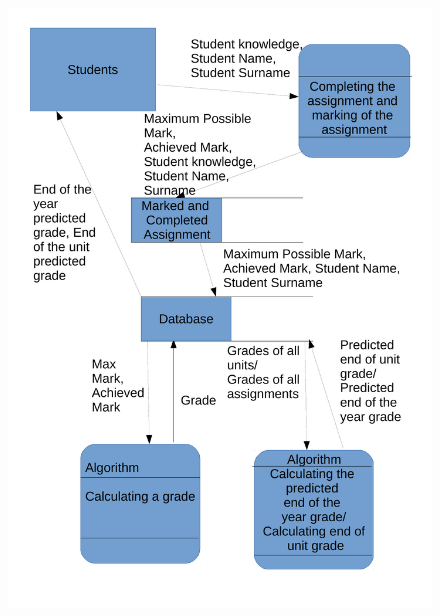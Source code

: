 \begin{algorithm}[H]
\begin{figure}[H]
    \includegraphics[width=\textwidth]{./Analysis/images/222DataFlowDiagram.pdf}
\end{figure}


\end{algorithm}
